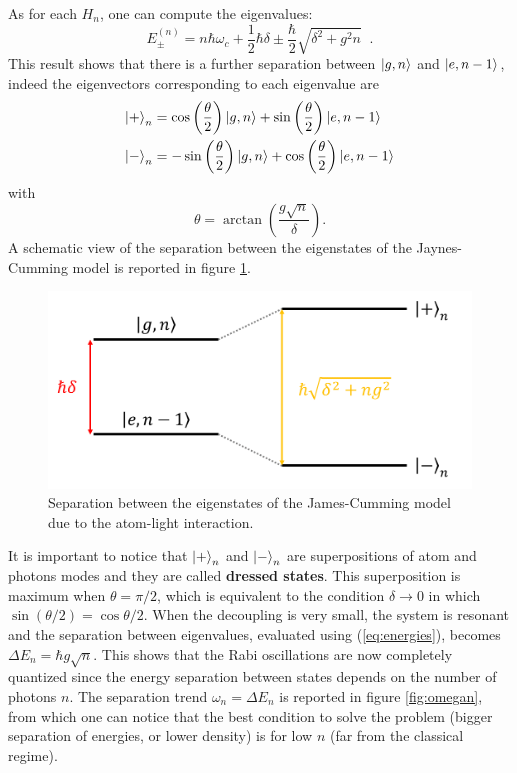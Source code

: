 As for each $H_n$, one can compute the eigenvalues: 
\begin{equation}
    E_\pm^{(n)} = n \hbar \omega_c + \frac{1}{2} \hbar \delta \pm \frac{\hbar}{2} \sqrt{\delta^2 + g^2 n} \;\;.
    \label{eq:energies}
\end{equation}
This result shows that there is a further separation between $\ket{g, n}$ and $\ket{e, n-1}$, indeed the eigenvectors corresponding to each eigenvalue are 
\begin{align*}
    \ket{+}_n &= \cos \left(\frac{\theta}{2}  \right) \ket{g, n} + \sin\left( \frac{\theta}{2} \right) \ket{e, n-1} \\
    \ket{-}_n &= - \sin\left( \frac{\theta}{2} \right) \ket{g, n} + \cos\left( \frac{\theta}{2} \right) \ket{e, n-1}
\end{align*}
with
\begin{equation*}
    \theta = \arctan \left( \frac{g \sqrt{n}}{\delta}\right).
\end{equation*}
A schematic view of the separation between the eigenstates of the Jaynes-Cumming model is reported in figure \ref{fig:newJCeigen}. 

\begin{figure}[t]
\centering
    \includegraphics[width=0.6\linewidth]{images/newEigenValue.png}
    \caption{Separation between the eigenstates of the James-Cumming model due to the atom-light interaction.}
    \label{fig:newJCeigen}
\end{figure}

It is important to notice that $\ket{+}_n$ and $\ket{-}_n$ are superpositions of atom and photons modes and they are called \textbf{dressed states}. This superposition is maximum when $\theta = \pi/2$, which is equivalent to the condition $\delta \to 0$ in which $\sin(\theta/2) = \cos{\theta/2}$. When the decoupling is very small, the system is resonant and the separation between eigenvalues, evaluated using (\ref{eq:energies}), becomes $\Delta E_n =  \hbar g \sqrt{n}$. This shows that the Rabi oscillations are now completely quantized since the energy separation between states depends on the number of photons $n$. The separation trend $\omega_n = \Delta E_n$ is reported in figure \ref{fig:omegan}, from which one can notice that the best condition to solve the problem (bigger separation of energies, or lower density) is for low $n$ (far from the classical regime). 

